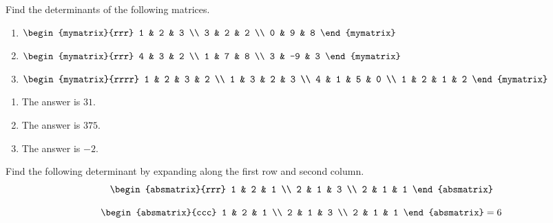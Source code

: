 \begin{enumialphparenastyle}
\begin{ex} Find the determinants of the following matrices.
\begin{enumerate}
\item $\begin{mymatrix}{rrr}
1 & 2 & 3 \\
3 & 2 & 2 \\
0 & 9 & 8
\end{mymatrix} $ 
\item $\begin{mymatrix}{rrr}
4 & 3 & 2 \\
1 & 7 & 8 \\
3 & -9 & 3
\end{mymatrix} $
\item $\begin{mymatrix}{rrrr}
1 & 2 & 3 & 2 \\
1 & 3 & 2 & 3 \\
4 & 1 & 5 & 0 \\
1 & 2 & 1 & 2
\end{mymatrix} $
\end{enumerate}
\begin{sol}
\begin{enumerate}
\item The answer is $31$.
\item The answer is $375$.
\item The answer is $-2$.
\end{enumerate}
\end{sol}
\end{ex}

\begin{ex} Find the following determinant by expanding along the first row and
second column. 
\begin{equation*}
\begin{absmatrix}{rrr}
1 & 2 & 1 \\
2 & 1 & 3 \\
2 & 1 & 1
\end{absmatrix}
\end{equation*}
\begin{sol}
\begin{equation*}
\begin{absmatrix}{ccc}
1 & 2 & 1 \\
2 & 1 & 3 \\
2 & 1 & 1
\end{absmatrix} =  6
\end{equation*}
\end{sol}
\end{ex}


\end{enumialphparenastyle}

